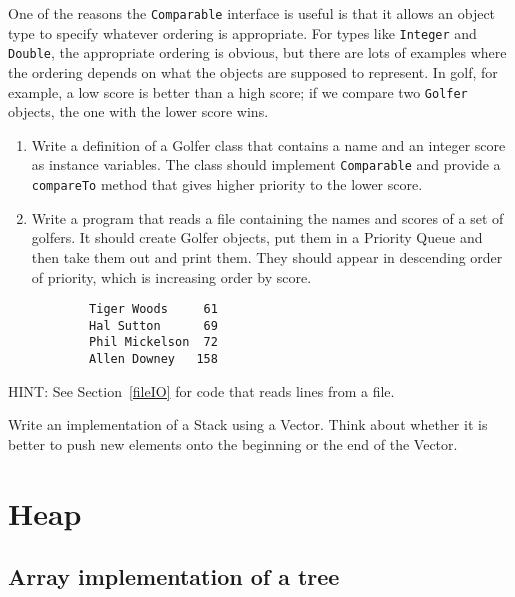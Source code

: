 \begin{exercise}
One of the reasons the {\tt Comparable} interface is useful is
that it allows an object type to specify whatever ordering is
appropriate.
For types like {\tt Integer} and {\tt Double}, the
appropriate 
ordering is obvious, but there are lots of examples where the
ordering depends on what the objects are supposed
to represent.  In golf, for example, a low score is better than
a high score; if we compare two {\tt Golfer} objects,
the one with the lower score wins.

\begin{enumerate}

\item Write a definition of a Golfer class that contains a
name and an integer score as instance variables.  The class
should implement {\tt Comparable} and provide a {\tt compareTo}
method that gives higher priority to the lower score.

\item Write a program that reads a file containing the names
and scores of a set of golfers.  It should create Golfer objects,
put them in a Priority Queue and then take them out and print them.
They should appear in descending order of priority, which is
increasing order by score.

\begin{verbatim}
        Tiger Woods     61
        Hal Sutton      69
        Phil Mickelson  72
        Allen Downey   158
\end{verbatim}

\end{enumerate}

HINT: See Section~\ref{fileIO} for code that reads lines
from a file.
\end {exercise}


\begin{exercise}
Write an implementation of a Stack using a Vector.  Think about
whether it is better to push new elements onto the beginning or
the end of the Vector.
\end{exercise}




\beforechapter
\chapter{Heap}
\label{chap18}

\section{Array implementation of a tree}

